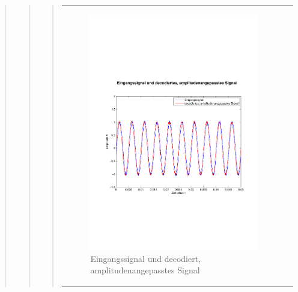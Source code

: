 \begin{quote}
\begin{quote}
\begin{quote}
\begin{center}
\begin{tabular}{ll}
                \hspace{-4cm}
                    \begin{minipage}{0.6\textwidth}
                        \begin{figure}[H]
                            \includegraphics[scale=0.4, trim = 0.8cm 7cm 0.8cm
                            7.5cm, clip]
                            {./Bilder/sin100_Eingang_vs_DecodiertAmpl-angepasst}
                              \caption{Eingangssignal und decodiert, \newline
                              amplitudenangepasstes Signal}
                        \end{figure}
                    \end{minipage}
                    

\end{tabular}
\end{center}
\end{quote}
\end{quote}
\end{quote}
